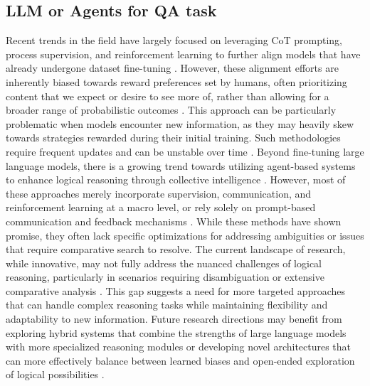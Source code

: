 \subsection{LLM or Agents for QA task}
Recent trends in the field have largely focused on leveraging CoT prompting, process supervision, and reinforcement learning to further align models that have already undergone dataset fine-tuning \cite{NEURIPS2020_1457c0d6,bai2022constitutional}. However, these alignment efforts are inherently biased towards reward preferences set by humans, often prioritizing content that we expect or desire to see more of, rather than allowing for a broader range of probabilistic outcomes \cite{hewitt2024instruction}. This approach can be particularly problematic when models encounter new information, as they may heavily skew towards strategies rewarded during their initial training. Such methodologies require frequent updates and can be unstable over time \cite{zelikman2022star}. Beyond fine-tuning large language models, there is a growing trend towards utilizing agent-based systems to enhance logical reasoning through collective intelligence \cite{zhu2022solving}. However, most of these approaches merely incorporate supervision, communication, and reinforcement learning at a macro level, or rely solely on prompt-based communication and feedback mechanisms \cite{li2023camel,kojima2022large}.
While these methods have shown promise, they often lack specific optimizations for addressing ambiguities or issues that require comparative search to resolve. The current landscape of research, while innovative, may not fully address the nuanced challenges of logical reasoning, particularly in scenarios requiring disambiguation or extensive comparative analysis \cite{park2023generative}. This gap suggests a need for more targeted approaches that can handle complex reasoning tasks while maintaining flexibility and adaptability to new information. Future research directions may benefit from exploring hybrid systems that combine the strengths of large language models with more specialized reasoning modules or developing novel architectures that can more effectively balance between learned biases and open-ended exploration of logical possibilities \cite{guo2024large}.